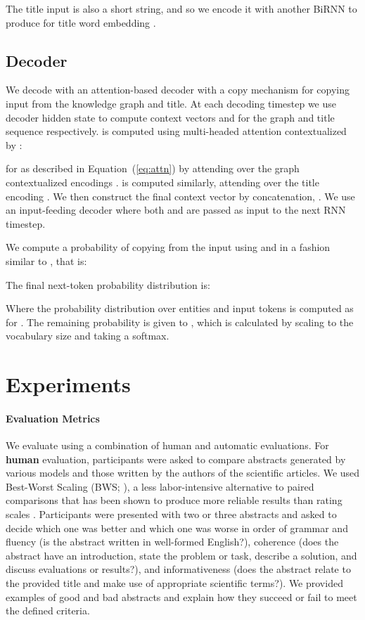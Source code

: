 \documentclass[11pt,a4paper]{article}
\begin{document}
The title input is also a short string, and so we encode it with another BiRNN to produce  for title word embedding .

\subsection{Decoder}\label{sec:decode}
We decode with an attention-based decoder with a copy mechanism for copying input from the knowledge graph and title. 
At each decoding timestep  we use decoder hidden state  to compute context vectors  and  for the graph and title sequence respectively.
 is computed using multi-headed attention contextualized by :

for  as described in Equation~(\ref{eq:attn}) by attending over the graph contextualized encodings  .
 is computed similarly, attending over the title encoding .  
We then construct the final context vector by concatenation, .
We use an input-feeding decoder \cite{Luong2015EffectiveAT} where both  and  are passed as input to the next RNN timestep. 


 We compute a probability  of copying from the input using  and  in a fashion similar to \citet{see2017get}, that is:
 
 The final next-token probability distribution is:

Where the probability distribution  over entities and input tokens is computed as  for .
 The remaining  probability is given to , which is calculated by scaling  to the vocabulary size and taking a softmax. 


\section{Experiments}

\paragraph{Evaluation Metrics} \label{sec:eval}
We evaluate using a combination of human and automatic evaluations. 
For \textbf{human} evaluation, participants were asked to compare abstracts generated by various models and those written by the authors of the scientific articles. 
We used Best-Worst Scaling (BWS; \cite{louviere1991best,louviere2015best}), a less labor-intensive alternative to paired comparisons that has been shown to produce more reliable results than rating scales \cite{Kiritchenko2016CapturingRF}.
Participants were presented with two or three abstracts and asked to decide which one was better and which one was worse in order of grammar and fluency (is the abstract written in well-formed English?), coherence (does the abstract have an introduction, state the problem or task, describe a solution, and discuss evaluations or results?), and informativeness (does the abstract relate to the provided title and make use of appropriate scientific terms?).
We provided examples of good and bad abstracts and explain how they succeed or fail to meet the defined criteria. 
\end{document}
